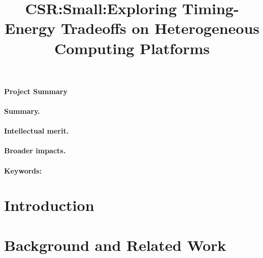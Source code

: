 \documentclass[10pt,letterpaper]{article}
\title{\textbf{CSR:Small:Exploring Timing-Energy Tradeoffs on Heterogeneous Computing Platforms}}
\date{\vspace{4mm}}
\begin{document}

\maketitle
{}


\newpage 

\begin{center}
\Large{\textbf{Project Summary}}
\end{center}

\paragraph{Summary.}

\paragraph{Intellectual merit.} 

\paragraph{Broader impacts.}

\paragraph{Keywords:} 

\newpage 

\section{Introduction}
\label{sec:intro}



\section{Background and Related Work}
\label{sec:motivation}

\end{document}

